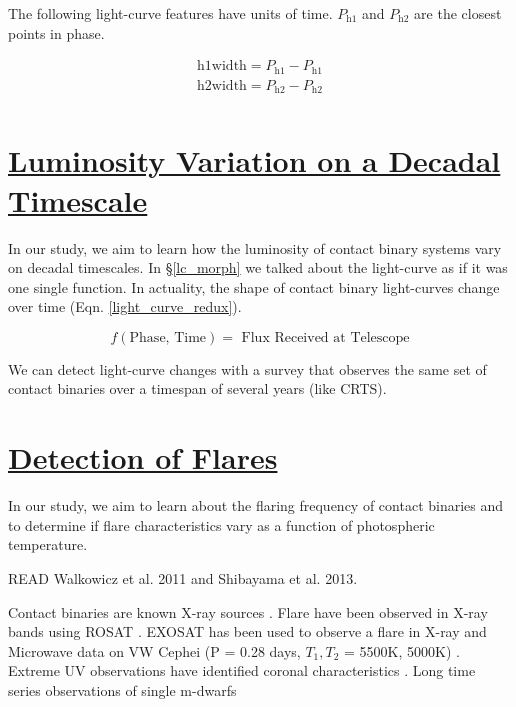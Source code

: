 \documentclass[12pt]{article} %
\numberwithin{equation}{section} %
\begin{document}
The following light-curve features have units of time. $P_{\text{h1}}$ and $P_{\text{h2}}$ are the closest points in phase.

\begin{multline} \label{time_features}
\text{h1width} = P_{\text{h1}} - P_{\text{h1}} \\
\text{h2width} = P_{\text{h2}} - P_{\text{h2}}  \\
\end{multline}


\cite{o1951so}

\section[Luminosity Variation on a Decadal Timescale]{\hyperlink{toc}{Luminosity Variation on a Decadal Timescale}} \label{sec: dec_var}

In our study, we aim to learn how the luminosity of contact binary systems vary on decadal timescales. In \S\ref{lc_morph} we talked about the light-curve as if it was one single function. In actuality, the shape of contact binary light-curves change over time (Eqn. \ref{light_curve_redux}). 

\begin{equation} \label{eqn: light_curve_redux}
f(\text{Phase, Time}) = \text{ Flux Received at Telescope}
\end{equation}

We can detect light-curve changes with a survey that observes the same set of contact binaries over a timespan of several years (like CRTS). 

\citep{bradstreet1988mapping}


\section[Detection of Flares]{\hyperlink{toc}{Detection of Flares}} \label{sec: flares}

In our study, we aim to learn about the flaring frequency of contact binaries and to determine if flare characteristics vary as a function of photospheric temperature.

READ Walkowicz et al. 2011 and Shibayama et al. 2013. 

Contact binaries are known X-ray sources \citep{chen2006w}. Flare have been observed in X-ray bands using ROSAT \citep{mcgale1996rosat}.
EXOSAT has been used to observe a flare in X-ray and Microwave data on VW Cephei (P =  0.28 days, $T_{1}, T_{2}$ = 5500K, 5000K) \citep{vilhu1988simultaneous}. Extreme UV observations have identified coronal characteristics \citep{brickhouse1998extreme}. Long time series observations of single m-dwarfs  \citep{lacy1976uv}
\end{document}
